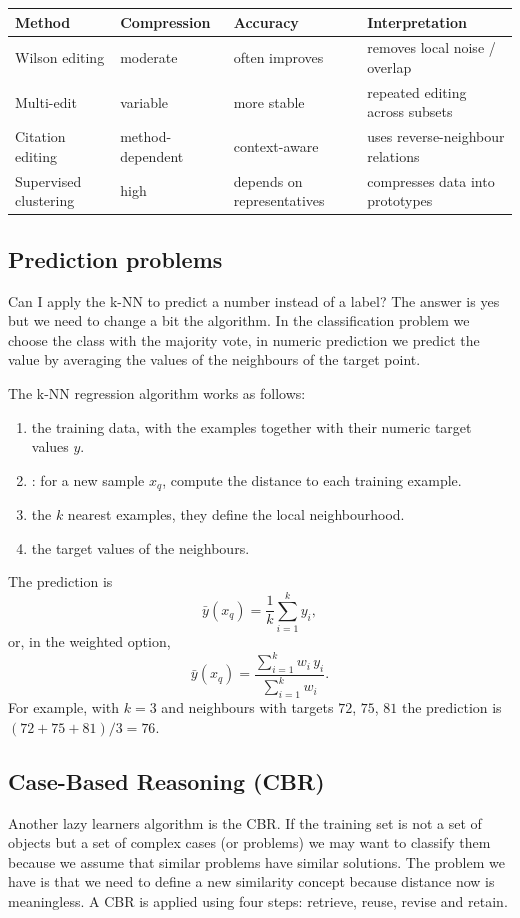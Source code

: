 \begin{center}
\begin{tabular}{llll}
\toprule
Method & Compression & Accuracy & Interpretation \\
\midrule
Wilson editing & moderate & often improves & removes local noise / overlap \\
Multi-edit & variable & more stable & repeated editing across subsets \\
Citation editing & method-dependent & context-aware & uses reverse-neighbour relations \\
Supervised clustering & high & depends on representatives & compresses data into prototypes \\
\bottomrule
\end{tabular}
\end{center}

\subsection{Prediction problems}

Can I apply the k-NN to predict a number instead of a label? The answer is yes but we need to change a bit the algorithm. In the classification problem we choose the class with the majority vote, in numeric prediction we predict the value by averaging the values of the neighbours of the target point.

The k-NN regression algorithm works as follows:
\begin{enumerate}
    \item {} the training data, with the examples together with their numeric target values $y$.
    \item {}: for a new sample $x_q$, compute the distance to each training example.
    \item {} the $k$ nearest examples, they define the local neighbourhood.
    \item {} the target values of the neighbours.
\end{enumerate}
The prediction is
\[
    \bar{y}(x_q)=\frac{1}{k}\sum_{i=1}^{k} y_i ,
\]
or, in the weighted option,
\[
    \bar{y}(x_q)=\frac{\sum_{i=1}^{k} w_i\, y_i}{\sum_{i=1}^{k} w_i}.
\]
For example, with $k=3$ and neighbours with targets $72$, $75$, $81$ the prediction is $(72+75+81)/3=76$.

\subsection{Case-Based Reasoning (CBR)}
Another lazy learners algorithm is the CBR. If the training set is not a set of objects but a set of complex cases (or problems) we may want to classify them because we assume that similar problems have similar solutions. The problem we have is that we need to define a new similarity concept because distance now is meaningless. A CBR is applied using four steps: retrieve, reuse, revise and retain.

